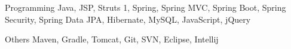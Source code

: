 
\begin{cvskills}

  \cvskill
  {Programming} %
  {Java, JSP, Struts 1, Spring, Spring MVC, Spring Boot, Spring Security, Spring Data JPA, Hibernate, MySQL, JavaScript, jQuery} %

  \cvskill
    {Others} %
    {Maven, Gradle, Tomcat, Git, SVN, Eclipse, Intellij} %

\end{cvskills}
